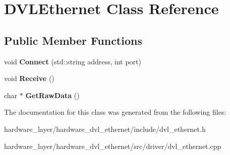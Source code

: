 \hypertarget{classDVLEthernet}{}\section{D\+V\+L\+Ethernet Class Reference}
\label{classDVLEthernet}
\subsection*{Public Member Functions}
\begin{DoxyCompactItemize}
\item 
\mbox{\label{classDVLEthernet_ad30402a8fe0eb3c717d77b2eed7084c1}} 
void {\bfseries Connect} (std\+::string address, int port)
\item 
\mbox{\label{classDVLEthernet_a3e9002198a62dbf53a5cd0e590915a1d}} 
void {\bfseries Receive} ()
\item 
\mbox{\label{classDVLEthernet_a9d797679645c1944672d4e94b415bfd0}} 
char $\ast$ {\bfseries Get\+Raw\+Data} ()
\end{DoxyCompactItemize}


The documentation for this class was generated from the following files\+:\begin{DoxyCompactItemize}
\item 
hardware\+\_\+layer/hardware\+\_\+dvl\+\_\+ethernet/include/dvl\+\_\+ethernet.\+h\item 
hardware\+\_\+layer/hardware\+\_\+dvl\+\_\+ethernet/src/driver/dvl\+\_\+ethernet.\+cpp\end{DoxyCompactItemize}
